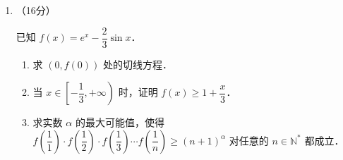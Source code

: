 \begin{description}
\begin{enumerate}[leftmargin=5pt]
        已知等差数列 $\{a_n\}$ 与等比数列 $\{b_n\}$ 满足：$a_1=2$，$b_1=1$，$a_2=b_1+b_2$，$a_4=b_3-b_1$．

        \begin{enumerate}[label=(\arabic*)]
            \item 求数列 $\{a_n\}$，$\{b_n\}$ 的通项公式；
            \item 记 $E_n=\{x\in\mathbb{R}\mid x\leqslant n,\text{存在 }k\in\mathbb{N}^*\text{ 使得 }x=a_k\text{ 或 }x=b_k\}$，记 $c_n$ 为 $E_n$ 中的元素个数．
            \begin{enumerate}[label=(\roman*)]
                \item 求 $c_{3^m}$；
                \item 求 $\displaystyle\sum_{m=1}^{3^n-1}(-1)^m\cdot a_m\cdot c_m$．
            \end{enumerate}
        \end{enumerate}

        \item （16分）

        已知 $f(x)=e^x-\dfrac{2}{3}\sin x$．

        \begin{enumerate}[label=(\arabic*)]
            \item 求 $(0,f(0))$ 处的切线方程．
            \item 当 $x\in\left[-\dfrac{1}{3},+\infty\right)$ 时，证明 $f(x)\geqslant1+\dfrac{x}{3}$．
            \item 求实数 $\alpha$ 的最大可能值，使得 $f\!\left(\dfrac{1}{1}\right)\cdot f\!\left(\dfrac{1}{2}\right)\cdot f\!\left(\dfrac{1}{3}\right)\cdots f\!\left(\dfrac{1}{n}\right)\geqslant(n+1)^\alpha$ 对任意的 $n\in\mathbb{N}^*$ 都成立．
        \end{enumerate}
    \end{enumerate}
\end{description}
\clearpage

